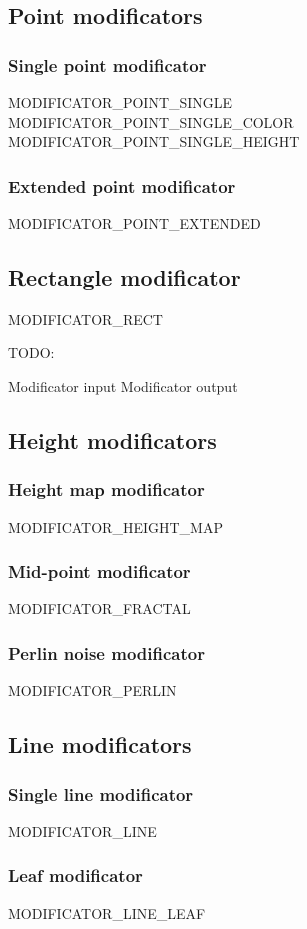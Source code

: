 \documentclass[11pt]{article}
\begin{document}
\subsection{Point modificators}
\subsubsection{Single point modificator}
MODIFICATOR\_POINT\_SINGLE
MODIFICATOR\_POINT\_SINGLE\_COLOR
MODIFICATOR\_POINT\_SINGLE\_HEIGHT
\subsubsection{Extended point modificator}
MODIFICATOR\_POINT\_EXTENDED

\subsection{Rectangle modificator}
MODIFICATOR\_RECT

TODO:

Modificator input
Modificator output


\subsection{Height modificators}
\subsubsection{Height map modificator}
MODIFICATOR\_HEIGHT\_MAP
\subsubsection{Mid-point modificator}
MODIFICATOR\_FRACTAL
\subsubsection{Perlin noise modificator}
MODIFICATOR\_PERLIN

\subsection{Line modificators}
\subsubsection{Single line modificator}
MODIFICATOR\_LINE
\subsubsection{Leaf modificator}
MODIFICATOR\_LINE\_LEAF
\end{document}
